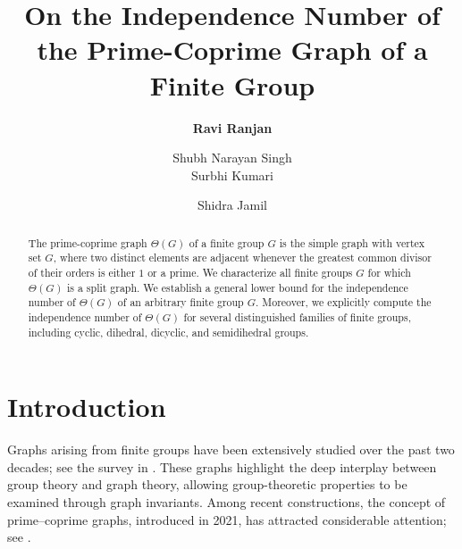 \documentclass{amsart}
\theoremstyle{plain}
\theoremstyle{definition}
\begin{document}
	
	
	\title[On the Independence Number of the Prime-Coprime Graph]{On the Independence Number of the Prime-Coprime Graph of a Finite Group}
			
\author[Ravi Ranjan, Shubh N. Singh, Surbhi Kumari, Shidra Jamil]{\bfseries Ravi Ranjan \and Shubh Narayan Singh \\
Surbhi Kumari \and  Shidra Jamil}
	
	\address{Department of Mathematics, Central University of South Bihar, Gaya--824236, Bihar, India}
	
		
	
	
	
\begin{abstract}
The prime-coprime graph $\Theta(G)$ of a finite group $G$ is the simple graph with vertex set $G$, where two distinct elements are adjacent whenever the greatest common divisor of their orders is either $1$ or a prime. We characterize all finite groups $G$ for which $\Theta(G)$ is a split graph. We establish a general lower bound for the independence number of $\Theta(G)$ of an arbitrary finite group $G$. Moreover, we explicitly compute the independence number of $\Theta(G)$ for several distinguished families of finite groups, including cyclic, dihedral, dicyclic, and semidihedral groups.
\end{abstract}
	
\maketitle
	

\section{Introduction}
Graphs arising from finite groups have been extensively studied over the past two decades; see the survey in \cite{camron-ijgt22}. These graphs highlight the deep interplay between group theory and graph theory, 
allowing group-theoretic properties to be examined through graph invariants. Among recent constructions, the concept of prime–coprime graphs, introduced in 2021, has attracted considerable attention; see \cite{adhikari-nsjom22, hao-2022, li-2022, shubh-arxiv25, sehgal-jmcs21, sehgal-25, sehgal-ijpam2024, sehgal-jmcsc-21}.
\end{document}
